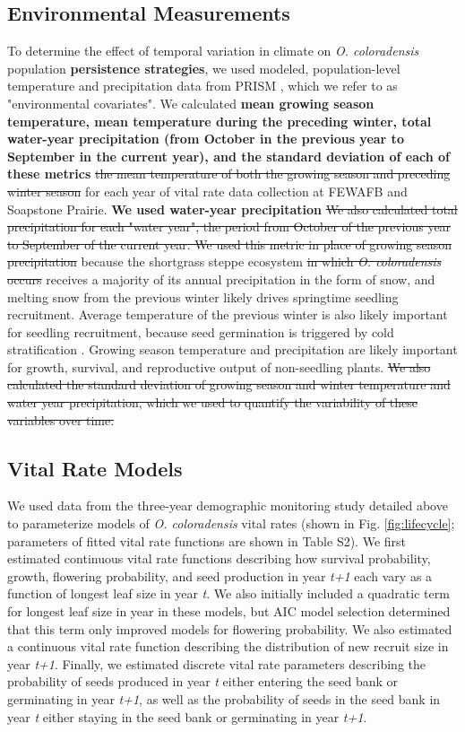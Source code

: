 \documentclass[12pt, letterpaper]{article}
\begin{document}
\subsection{Environmental Measurements}
To determine the effect of temporal variation in climate on \textit{O. coloradensis} population \textbf{persistence strategies}, we used modeled, population-level temperature and precipitation data from PRISM \cite{PRISMClimateGroupOregonStateUniversity2021PRISMUniversity}, which we refer to as "environmental covariates". We calculated \textbf{mean growing season temperature, mean temperature during the preceding winter, total water-year precipitation (from October in the previous year to September in the current year), and the standard deviation of each of these metrics} \sout{the mean temperature of both the growing season and preceding winter season} for each year of vital rate data collection at FEWAFB and Soapstone Prairie. \textbf{We used water-year precipitation} \sout{We also calculated total precipitation for each "water year", the period from October of the previous year to September of the current year. We used this metric in place of growing season precipitation} because the shortgrass steppe ecosystem \sout{in which \textit{O. coloradensis} occurs} receives a majority of its annual precipitation in the form of snow, and melting snow from the previous winter likely drives springtime seedling recruitment. Average temperature of the previous winter is also likely important for seedling recruitment, because seed germination is triggered by cold stratification \cite{Burgess2005CapsuleColoradensis}. Growing season temperature and precipitation are likely important for growth, survival, and reproductive output of non-seedling plants. \sout{We also calculated the standard deviation of growing season and winter temperature and water year precipitation, which we used to quantify the variability of these variables over time.} 

\subsection{Vital Rate Models}
We used data from the three-year demographic monitoring study detailed above to parameterize models of \textit{O. coloradensis} vital rates (shown in Fig. \ref{fig:lifecycle}; parameters of fitted vital rate functions are shown in Table S2). We first estimated continuous vital rate functions describing how survival probability, growth, flowering probability, and seed production in year \textit{t+1} each vary as a function of longest leaf size in year \textit{t}. We also initially included a quadratic term for longest leaf size in year  in these models, but AIC model selection determined that this term only improved models for flowering probability. We also estimated a continuous vital rate function describing the distribution of new recruit size in year \textit{t+1}. Finally, we estimated discrete vital rate parameters describing the probability of seeds produced in year \textit{t} either entering the seed bank or germinating in year \textit{t+1}, as well as the probability of seeds in the seed bank in year \textit{t} either staying in the seed bank or germinating in year \textit{t+1}.  
\end{document}
